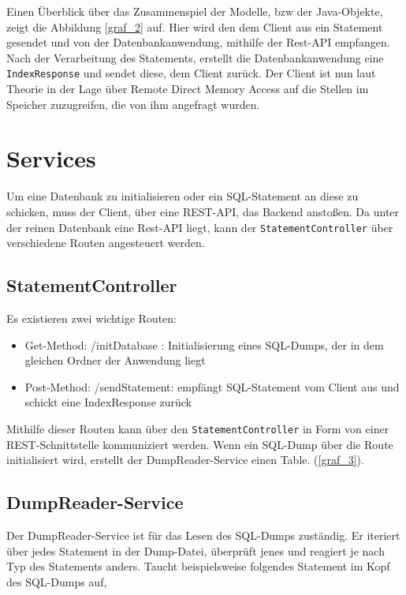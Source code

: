 Einen Überblick über das Zusammenspiel der Modelle, bzw der Java-Objekte, zeigt die Abbildung \ref{graf_2} auf. 
Hier wird den dem Client aus ein Statement gesendet und von der Datenbankanwendung, mithilfe der Rest-API empfangen. Nach der Verarbeitung des Statements, erstellt die Datenbankanwendung eine \texttt{IndexResponse} und sendet diese, dem Client zurück.
Der Client ist nun laut Theorie in der Lage über Remote Direct Memory Access auf die Stellen im Speicher zuzugreifen, die von ihm angefragt wurden.


\section{Services}
Um eine Datenbank zu initialisieren oder ein SQL-Statement an diese zu schicken, muss der Client, über eine REST-API, das Backend anstoßen.
Da unter der reinen Datenbank eine Rest-API liegt, kann der \texttt{StatementController} über verschiedene Routen angesteuert werden.


\subsection{StatementController}
Es existieren zwei wichtige Routen:

\begin{itemize}
 \item Get-Method: /initDatabase : Initialisierung eines SQL-Dumps, der in dem gleichen Ordner der Anwendung liegt
 \item Post-Method: /sendStatement: empfängt SQL-Statement vom Client aus und schickt eine IndexResponse zurück
\end{itemize}

Mithilfe dieser Routen kann über den \texttt{StatementController} in Form von einer REST-Schnittstelle kommuniziert werden.
Wenn ein SQL-Dump über die Route initialisiert wird, erstellt der DumpReader-Service einen Table. (\ref{graf_3}). 


\subsection{DumpReader-Service}
\label{DumpReader}
Der DumpReader-Service ist für das Lesen des SQL-Dumps zuständig. Er iteriert über jedes Statement in der Dump-Datei, überprüft jenes und reagiert je nach Typ des Statements anders.
Taucht beispielsweise folgendes Statement im Kopf des SQL-Dumps auf,
\\

